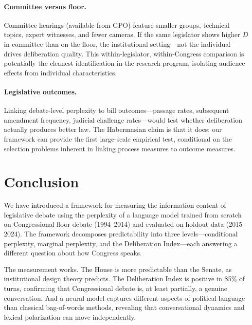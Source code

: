 \documentclass[12pt]{article}
\newcommand{\DI}{\mathit{D}}
\begin{document}
\paragraph{Committee versus floor.} Committee hearings (available from GPO) feature smaller groups, technical topics, expert witnesses, and fewer cameras. If the same legislator shows higher $\DI$ in committee than on the floor, the institutional setting---not the individual---drives deliberation quality. This within-legislator, within-Congress comparison is potentially the cleanest identification in the research program, isolating audience effects from individual characteristics.

\paragraph{Legislative outcomes.} Linking debate-level perplexity to bill outcomes---passage rates, subsequent amendment frequency, judicial challenge rates---would test whether deliberation actually produces better law. The Habermasian claim is that it does; our framework can provide the first large-scale empirical test, conditional on the selection problems inherent in linking process measures to outcome measures.


\section{Conclusion}

We have introduced a framework for measuring the information content of legislative debate using the perplexity of a language model trained from scratch on Congressional floor debate (1994--2014) and evaluated on holdout data (2015--2024). The framework decomposes predictability into three levels---conditional perplexity, marginal perplexity, and the Deliberation Index---each answering a different question about how Congress speaks.

The measurement works. The House is more predictable than the Senate, as institutional design theory predicts. The Deliberation Index is positive in 85\% of turns, confirming that Congressional debate is, at least partially, a genuine conversation. And a neural model captures different aspects of political language than classical bag-of-words methods, revealing that conversational dynamics and lexical polarization can move independently.
\end{document}
